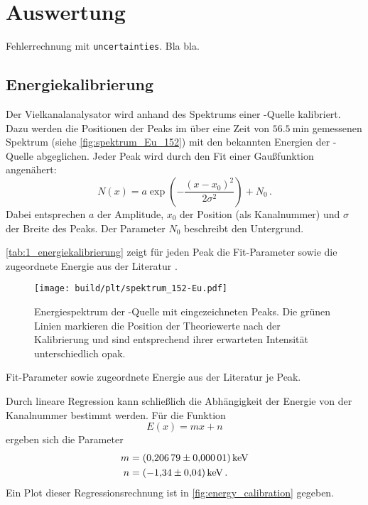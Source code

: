 \section{Auswertung}
\label{sec:auswertung}
Fehlerrechnung mit \texttt{uncertainties}.
Bla bla. %

\subsection{Energiekalibrierung}
Der Vielkanalanalysator wird anhand des Spektrums einer -Quelle kalibriert.
Dazu werden die Positionen der Peaks im
    über eine Zeit von $\SI{56.5}{\minute}$ gemessenen
Spektrum (siehe \autoref{fig:spektrum_Eu_152})
mit den bekannten Energien der -Quelle abgeglichen.
Jeder Peak wird durch den Fit einer Gaußfunktion angenähert:
\begin{equation*}
    N(x) = a \exp\left(-\frac{(x - x_0)^2}{2 \sigma^2}\right) + N_0 \, .
\end{equation*}
Dabei entsprechen
    $a$ der Amplitude, %
    $x_0$ der Position (als Kanalnummer)
    und $\sigma$ der Breite
des Peaks.
Der Parameter $N_0$ beschreibt den Untergrund.

\autoref{tab:1_energiekalibrierung} zeigt für jeden Peak
    die Fit-Parameter sowie die zugeordnete Energie aus der Literatur \cite{lara}.

\begin{figure}
    \centering
    \texttt{[image: build/plt/spektrum\_152-Eu.pdf]}
    \caption{
        Energiespektrum der -Quelle mit eingezeichneten Peaks.
        Die grünen Linien markieren die Position der Theoriewerte nach der Kalibrierung
        und sind entsprechend ihrer erwarteten Intensität unterschiedlich opak.
    }
    \label{fig:spektrum_Eu_152}
\end{figure}

\begin{table}
    \centering
    \caption{Fit-Parameter sowie zugeordnete Energie aus der Literatur \cite{lara} je Peak.}
    \label{tab:1_energiekalibrierung}
\end{table}

Durch lineare Regression kann schließlich die Abhängigkeit der Energie von der Kanalnummer bestimmt werden.
Für die Funktion
\begin{equation*}
    E(x) = m x + n
\end{equation*}
ergeben sich die Parameter
\begin{align*}
    m &= \SI{0.20679 \pm 0.00001}{\kilo\electronvolt} \\
    n &= \SI{-1.34 \pm 0.04}{\kilo\electronvolt} \, .
\end{align*}
Ein Plot dieser Regressionsrechnung ist in \autoref{fig:energy_calibration} gegeben.

